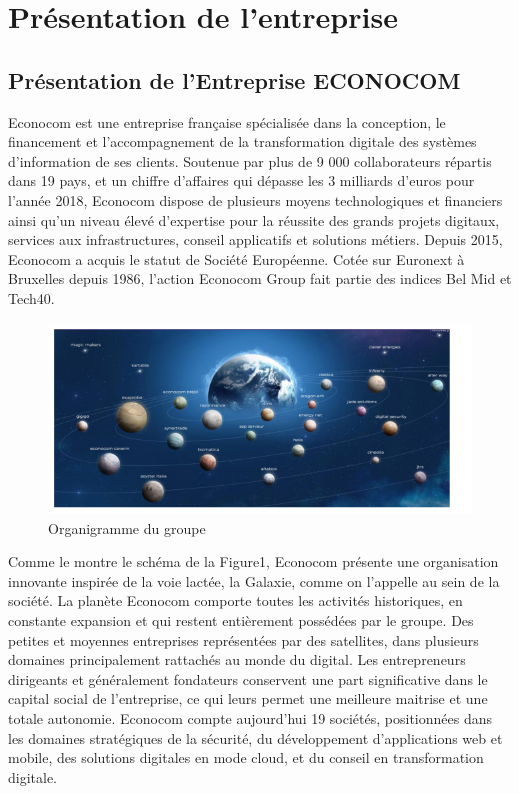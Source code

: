 \chapter{Présentation de l'entreprise}
\minitoc
\newpage
 
\section{Présentation de l'Entreprise ECONOCOM}
Econocom est une entreprise française spécialisée dans la conception, le financement
et l’accompagnement de la transformation digitale des systèmes d’information de ses clients.
Soutenue par plus de 9 000 collaborateurs répartis dans 19 pays, et un chiffre d’affaires qui
dépasse les 3 milliards d’euros pour l’année 2018, Econocom dispose de plusieurs moyens
technologiques et financiers ainsi qu’un niveau élevé d’expertise pour la réussite des grands
projets digitaux, services aux infrastructures, conseil applicatifs et solutions métiers.
Depuis 2015, Econocom a acquis le statut de Société Européenne. Cotée sur Euronext
à Bruxelles depuis 1986, l’action Econocom Group fait partie des indices Bel Mid et Tech40.

\begin{figure}[h]
\begin{center}
\includegraphics[scale=0.70]{Organigramme_Econocom.png}
\caption[Organigramme du groupe]{Organigramme du groupe}
\label{monlabel}
\end{center}
\end{figure}


Comme le montre le schéma de la Figure1, Econocom présente une organisation
innovante inspirée de la voie lactée, la Galaxie, comme on l’appelle au sein de la société. La planète Econocom comporte toutes les activités historiques, en constante expansion et qui restent entièrement possédées par le groupe. Des petites et moyennes entreprises représentées par des satellites, dans plusieurs domaines principalement rattachés au monde du digital. Les entrepreneurs dirigeants et généralement fondateurs conservent une part significative dans le capital social de l’entreprise, ce qui leurs permet une meilleure maitrise et une totale autonomie. Econocom compte aujourd’hui 19 sociétés, positionnées dans les domaines stratégiques de la sécurité, du développement d’applications web et mobile, des solutions digitales en mode cloud, et du conseil en transformation digitale.

